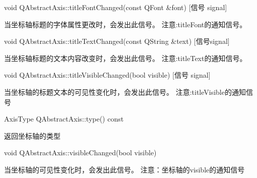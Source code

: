 void QAbstractAxis::titleFontChanged(const QFont \&font) [信号 signal]

当坐标轴标题的字体属性更改时，会发出此信号。 注意:titleFont的通知信号。

void QAbstractAxis::titleTextChanged(const QString \&text) [信号signal] 

当坐标轴标题的文本内容改变时，会发出此信号。 注意:titleText的通知信号。

void QAbstractAxis::titleVisibleChanged(bool visible) [信号 signal] 

当坐标轴的标题文本的可见性变化时，会发出此信号。 注意:titleVisible的通知信号

AxisType QAbstractAxis::type() const 

返回坐标轴的类型

void QAbstractAxis::visibleChanged(bool visible) 

当坐标轴的可见性变化时，会发出此信号。 注意：坐标轴的visible的通知信号

